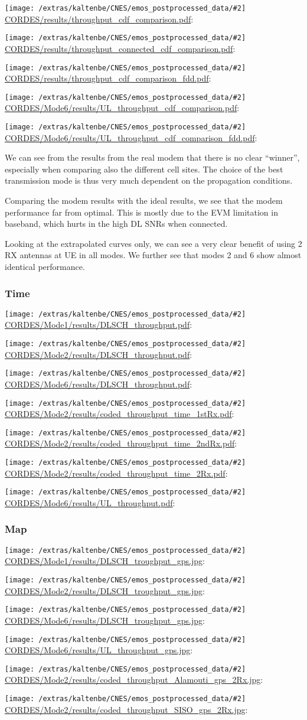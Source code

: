 \documentclass[a4paper,10pt]{article}
\newcommand{\printfile}[2][]{
 \begin{minipage}{8cm}
  \centering
  \texttt{[image: /extras/kaltenbe/CNES/emos\_postprocessed\_data/\#2]}
  \url{#2}: #1

 \end{minipage}
}
\begin{document}
\printfile{CORDES/results/throughput_cdf_comparison.pdf}
\printfile{CORDES/results/throughput_connected_cdf_comparison.pdf}

\printfile{CORDES/results/throughput_cdf_comparison_fdd.pdf}

\printfile{CORDES/Mode6/results/UL_throughput_cdf_comparison.pdf}
\printfile{CORDES/Mode6/results/UL_throughput_cdf_comparison_fdd.pdf}

We can see from the results from the real modem that there is no clear ``winner'', especially when comparing also the different cell sites. The choice of the best transmission mode is thus very much dependent on the propagation conditions. 

Comparing the modem results with the ideal results, we see that the modem performance far from optimal. This is mostly due to the EVM limitation in baseband, which hurts in the high DL SNRs when connected.

Looking at the extrapolated curves only, we can see a very clear benefit of using 2 RX antennas at UE in all modes. We further see that modes 2 and 6 show almost identical performance. 


\subsubsection{Time}

\printfile{CORDES/Mode1/results/DLSCH_throughput.pdf}
\printfile{CORDES/Mode2/results/DLSCH_throughput.pdf}

\printfile{CORDES/Mode6/results/DLSCH_throughput.pdf}
\printfile{CORDES/Mode2/results/coded_throughput_time_1stRx.pdf}

\printfile{CORDES/Mode2/results/coded_throughput_time_2ndRx.pdf}
\printfile{CORDES/Mode2/results/coded_throughput_time_2Rx.pdf}

\printfile{CORDES/Mode6/results/UL_throughput.pdf}


\subsubsection{Map}

\printfile{CORDES/Mode1/results/DLSCH_troughput_gps.jpg}
\printfile{CORDES/Mode2/results/DLSCH_troughput_gps.jpg}

\printfile{CORDES/Mode6/results/DLSCH_troughput_gps.jpg}
\printfile{CORDES/Mode6/results/UL_throughput_gps.jpg}

\printfile{CORDES/Mode2/results/coded_throughput_Alamouti_gps_2Rx.jpg}
\printfile{CORDES/Mode2/results/coded_throughput_SISO_gps_2Rx.jpg}
\end{document}
